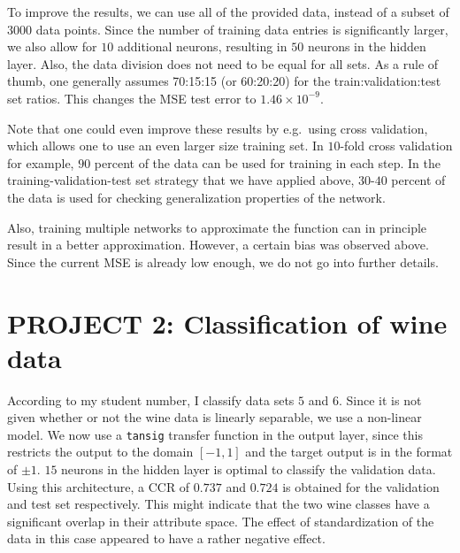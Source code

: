 \documentclass[pdftex,11pt,a4paper]{article}
\begin{document}
To improve the results, we can use all of the provided data, instead of a subset of $3000$ data points. Since the number of training data entries is significantly larger, we also allow for $10$ additional neurons, resulting in $50$ neurons in the hidden layer. Also, the data division does not need to be equal for all sets. As a rule of thumb, one generally assumes 70:15:15 (or 60:20:20) for the train:validation:test set ratios. This changes the MSE test error to $1.46 \times 10^{-9}$.

Note that one could even improve these results by e.g.\ using cross validation, which allows one to use an even larger size training set. In $10$-fold cross validation for example, $90$ percent of the data can be used for training in each step. In the training-validation-test set strategy that we have applied above, $30$-$40$ percent of the data is used for checking generalization properties of the network.

Also, training multiple networks to approximate the function can in principle result in a better approximation. However, a certain bias was observed above. Since the current MSE is already low enough, we do not go into further details.

\section{PROJECT 2: Classification of wine data}\label{sec:classification}
According to my student number, I classify data sets $5$ and $6$. Since it is not given whether or not the wine data is linearly separable, we use a non-linear model. We now use a \texttt{tansig} transfer function in the output layer, since this restricts the output to the domain $[-1,1]$ and the target output is in the format of $\pm 1$. 
$15$ neurons in the hidden layer is optimal to classify the validation data. Using this architecture, a CCR of $0.737$  and $0.724$ is obtained for the validation and test set respectively. This might indicate that the two wine classes have a significant overlap in their attribute space. The effect of standardization of the data in this case appeared to have a rather negative effect.
\end{document}

